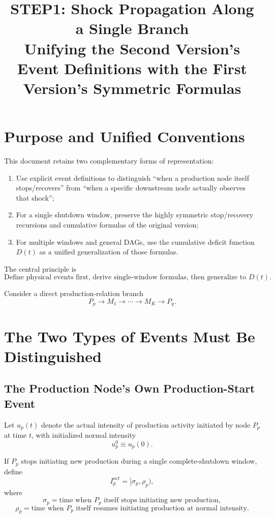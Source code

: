 \documentclass[11pt]{article}
\title{STEP1: Shock Propagation Along a Single Branch\\
Unifying the Second Version's Event Definitions with the First Version's Symmetric Formulas}
\author{}
\date{}
\begin{document}
\maketitle

\section{Purpose and Unified Conventions}

This document retains two complementary forms of representation:

\begin{enumerate}
    \item Use explicit event definitions to distinguish ``when a production node itself stops/recovers'' from
    ``when a specific downstream node actually observes that shock'';
    \item For a single shutdown window, preserve the highly symmetric
    stop/recovery recursions and cumulative formulas of the original version;
    \item For multiple windows and general DAGs, use the cumulative deficit function \(D(t)\)
    as a unified generalization of those formulas.
\end{enumerate}

The central principle is
\[
\boxed{
\text{Define physical events first, derive single-window formulas, then generalize to }D(t)\text{.}
}
\]

Consider a direct production-relation branch
\[
P_p\longrightarrow M_1\longrightarrow\cdots
\longrightarrow M_K\longrightarrow P_q.
\]

\section{The Two Types of Events Must Be Distinguished}

\subsection{The Production Node's Own Production-Start Event}

Let \(u_p(t)\) denote the actual intensity of production activity initiated by node \(P_p\) at time \(t\),
with initialized normal intensity
\[
u_p^0\equiv u_p(0).
\]

If \(P_p\) stops initiating new production during a single complete-shutdown window, define
\[
\boxed{
I_p^{act}=[\sigma_p,\rho_p),
}
\]
where
\[
\boxed{
\sigma_p
=
\text{time when \(P_p\) itself stops initiating new production},
}
\]
\[
\boxed{
\rho_p
=
\text{time when \(P_p\) itself resumes initiating production at normal intensity}.
}
\]
\end{document}
